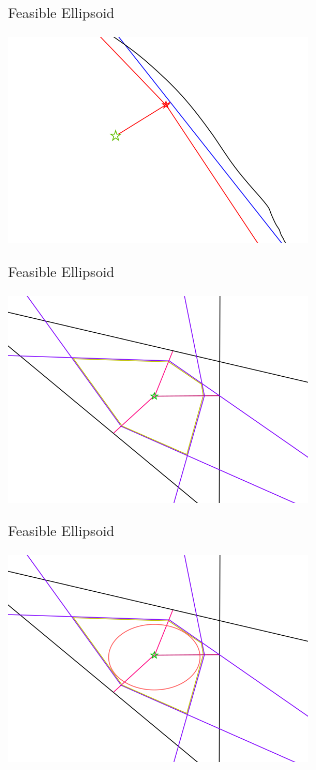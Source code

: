 \documentclass{beamer}
\begin{document}
\begin{frame}{Feasible Ellipsoid}
	\begin{center}
		\includegraphics[width=300px]{images/explanation_3.png}
	\end{center}
\end{frame}


\begin{frame}{Feasible Ellipsoid}
	\begin{center}
		\includegraphics[width=300px]{images/completed_1.png}
	\end{center}
\end{frame}


\begin{frame}{Feasible Ellipsoid}
	\begin{center}
		\includegraphics[width=300px]{images/completed_2.png}
	\end{center}
\end{frame}
\end{document}
